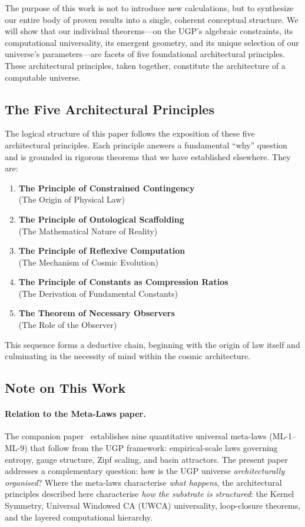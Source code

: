 \documentclass[12pt]{article}
\begin{document}
The purpose of this work is not to introduce new calculations, but to synthesize our entire body of proven results into a single, coherent conceptual structure. We will show that our individual theorems—on the UGP's algebraic constraints, its computational universality, its emergent geometry, and its unique selection of our universe's parameters—are facets of five foundational architectural principles. These architectural principles, taken together, constitute the architecture of a computable universe.

\subsection{The Five Architectural Principles}
The logical structure of this paper follows the exposition of these five architectural principles. Each principle answers a fundamental ``why'' question and is grounded in rigorous theorems that we have established elsewhere. They are:
\begin{enumerate}[label=\textbf{Pillar \Roman*:}, itemsep=0.5em, leftmargin=*]
    \item \textbf{The Principle of Constrained Contingency} \\ (The Origin of Physical Law)
    \item \textbf{The Principle of Ontological Scaffolding} \\ (The Mathematical Nature of Reality)
    \item \textbf{The Principle of Reflexive Computation} \\ (The Mechanism of Cosmic Evolution)
    \item \textbf{The Principle of Constants as Compression Ratios} \\ (The Derivation of Fundamental Constants)
    \item \textbf{The Theorem of Necessary Observers} \\ (The Role of the Observer)
\end{enumerate}
This sequence forms a deductive chain, beginning with the origin of law itself and culminating in the necessity of mind within the cosmic architecture.

\subsection{Note on This Work}

\paragraph{Relation to the Meta-Laws paper.}
The companion paper~\cite{SpivackUGPProgram} establishes nine quantitative universal
meta-laws (ML-1--ML-9) that follow from the UGP framework: empirical-scale laws
governing entropy, gauge structure, Zipf scaling, and basin attractors.
The present paper addresses a complementary question: how is the UGP universe
\emph{architecturally organised}?  Where the meta-laws characterise
\emph{what happens}, the architectural principles described here characterise
\emph{how the substrate is structured}: the Kernel Symmetry, Universal Windowed CA (UWCA) universality,
loop-closure theorems, and the layered computational hierarchy.
\end{document}
